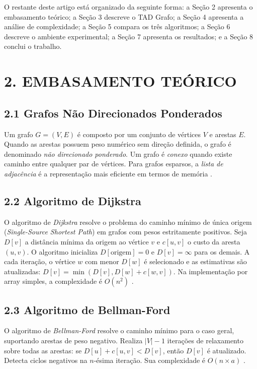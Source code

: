 \documentclass[12pt, a4paper]{article}
\begin{document}
O restante deste artigo está organizado da seguinte forma: a Seção 2 apresenta o embasamento teórico; a Seção 3 descreve o TAD Grafo; a Seção 4 apresenta a análise de complexidade; a Seção 5 compara os três algoritmos; a Seção 6 descreve o ambiente experimental; a Seção 7 apresenta os resultados; e a Seção 8 conclui o trabalho.

\section*{2. EMBASAMENTO TEÓRICO}

\subsection*{2.1 Grafos Não Direcionados Ponderados}

Um grafo $G = (V, E)$ é composto por um conjunto de vértices $V$ e arestas $E$. Quando as arestas possuem peso numérico sem direção definida, o grafo é denominado \textit{não direcionado ponderado}. Um grafo é \textit{conexo} quando existe caminho entre qualquer par de vértices. Para grafos esparsos, a \textit{lista de adjacência} é a representação mais eficiente em termos de memória \cite{neves2026a, dasgupta2006}.

\subsection*{2.2 Algoritmo de Dijkstra}

O algoritmo de \textit{Dijkstra} \cite{dijkstra1959} resolve o problema do caminho mínimo de única origem (\textit{Single-Source Shortest Path}) em grafos com pesos estritamente positivos. Seja $D[v]$ a distância mínima da origem ao vértice $v$ e $c[u,v]$ o custo da aresta $(u,v)$. O algoritmo inicializa $D[\text{origem}] = 0$ e $D[v] = \infty$ para os demais. A cada iteração, o vértice $w$ com menor $D[w]$ é selecionado e as estimativas são atualizadas: $D[v] = \min(D[v], D[w] + c[w,v])$. Na implementação por array simples, a complexidade é $O(n^2)$ \cite{cormen2009, sedgewick2011}.

\subsection*{2.3 Algoritmo de Bellman-Ford}

O algoritmo de \textit{Bellman-Ford} \cite{bellman1958} resolve o caminho mínimo para o caso geral, suportando arestas de peso negativo. Realiza $|V|-1$ iterações de relaxamento sobre todas as arestas: se $D[u] + c[u,v] < D[v]$, então $D[v]$ é atualizado. Detecta ciclos negativos na $n$-ésima iteração. Sua complexidade é $O(n \times a)$ \cite{bellman1958, cormen2009}.
\end{document}

